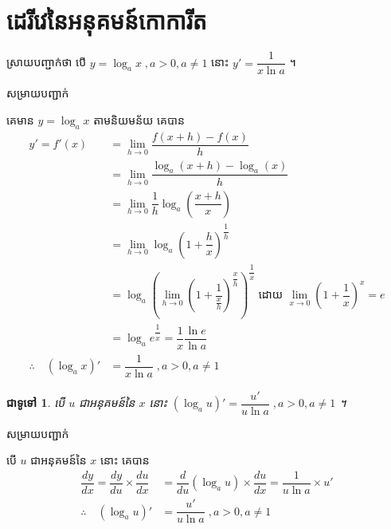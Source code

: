 \documentclass[12pt,fleqn]{book} %
\newtheorem{general}{\kml ជាទូទៅ}
\newcommand{\solution}{{\begin{center}\kml \color{blue} សម្រាយបញ្ជាក់\end{center} }}
\begin{document}
\section{ដេរីវេនៃអនុគមន៍កោការីត}
ស្រាយបញ្ជាក់ថា បើ $y=\log _a x \;, a>0,a\neq 1$ នោះ $y'=\dfrac{1}{x\ln a}$ ។
\solution 
គេមាន $y=\log_a x$ តាមនិយមន័យ គេបាន
\begin{align*}
y'=f'(x)&=\lim_{h\to 0}\dfrac{f(x+h)-f(x)}{h}\\
&=\lim_{h\to 0}\dfrac{\log_a (x+h)-\log_a (x)}{h}\\
&=\lim_{h\to 0}\dfrac{1}{h}\log_a \left(\dfrac{x+h}{x} \right)\\
&=\lim_{h\to 0}\log_a \left(1+\dfrac{h}{x} \right)^\dfrac{1}{h}\\
&=\log_a \left(\lim_{h\to 0}\left(1+\dfrac{1}{\frac{x}{h}}\right)^{\dfrac{x}{h}}\right)^\dfrac{1}{x}\; \text{ដោយ }\lim_{x\to 0}(1+\dfrac{1}{x})^x=e\\
&=\log_a e^{\dfrac{1}{x}}=\dfrac{1}{x}\dfrac{\ln e}{\ln a}\\
\therefore \quad (\log_a x)'&=\dfrac{1}{x\ln a}\;, a>0,a\neq 1
\end{align*}

\begin{general}
បើ $u$ ជាអនុគមន៍នៃ $x$ នោះ $(\log_a u)'=\dfrac{u'}{u\ln a}\;, a>0,a\neq 1$ ។ 
\end{general}
\solution 
បើ $u$ ជាអនុគមន៍នៃ $x$ នោះ  គេបាន 
\begin{align*}
\dfrac{dy}{dx}=\dfrac{dy}{du}\times \dfrac{du}{dx}&=\dfrac{d}{du}(\log_a u)\times \dfrac{du}{dx}=\dfrac{1}{u\ln a}\times u'\\
\therefore \quad (\log_a u)'&=\dfrac{u'}{u\ln a} \;, a>0,a\neq 1
\end{align*}
\end{document}
